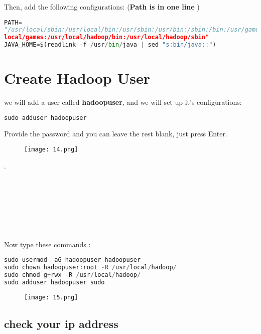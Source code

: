 \documentclass[onecolumn]{article}
\begin{document}
Then, add the following configurations: (\textbf{Path is in one line} )

\begin{lstlisting}[language=Python, caption= sudo nano /etc/environment ]
PATH=
"/usr/local/sbin:/usr/local/bin:/usr/sbin:/usr/bin:/sbin:/bin:/usr/games:/usr/
local/games:/usr/local/hadoop/bin:/usr/local/hadoop/sbin"
JAVA_HOME=$(readlink -f /usr/bin/java | sed "s:bin/java::")
\end{lstlisting}


\section{Create Hadoop User}

we will add a user called \textbf{hadoopuser}, and we will set up it’s configurations:

\begin{lstlisting}[language=Python, caption= sudo nano /etc/environment ]
sudo adduser hadoopuser
\end{lstlisting}

Provide the password and you can leave the rest blank, just press Enter.

\begin{figure}[ht!]
\centering
\texttt{[image: 14.png]}
\caption{\label{}}
\end{figure}
.\\\\\\\\\\\\\\\\
Now type these commands :

\begin{lstlisting}[language=Python, caption= a ]
sudo usermod -aG hadoopuser hadoopuser
sudo chown hadoopuser:root -R /usr/local/hadoop/
sudo chmod g+rwx -R /usr/local/hadoop/
sudo adduser hadoopuser sudo
\end{lstlisting}

\begin{figure}[ht!]
\centering
\texttt{[image: 15.png]}
\caption{\label{}}
\end{figure}

\subsection{check your ip address}
\end{document}
